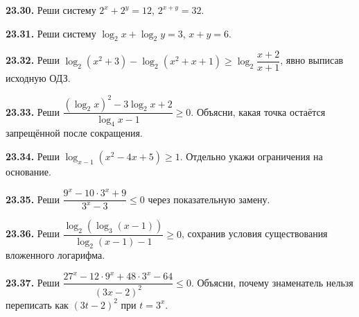 \noindent\begin{minipage}[t]{\linewidth}\textbf{23.30.}\starmark{} Реши систему \(2^x+2^y=12\), \(2^{x+y}=32\).\par\end{minipage}\par
\noindent\begin{minipage}[t]{\linewidth}\textbf{23.31.}\starmark{} Реши систему \(\log_2x+\log_2y=3\), \(x+y=6\).\par\end{minipage}\par
\noindent\begin{minipage}[t]{\linewidth}\textbf{23.32.}\starmark{} Реши \(\log_2(x^2+3)-\log_2(x^2+x+1)\ge\log_2\dfrac{x+2}{x+1}\), явно выписав исходную ОДЗ.\par\end{minipage}\par
\noindent\begin{minipage}[t]{\linewidth}\textbf{23.33.}\starmark{} Реши \(\dfrac{(\log_2x)^2-3\log_2x+2}{\log_4x-1}\ge0\). Объясни, какая точка остаётся запрещённой после сокращения.\par\end{minipage}\par
\noindent\begin{minipage}[t]{\linewidth}\textbf{23.34.}\starmark{} Реши \(\log_{x-1}(x^2-4x+5)\ge1\). Отдельно укажи ограничения на основание.\par\end{minipage}\par
\noindent\begin{minipage}[t]{\linewidth}\textbf{23.35.}\starmark{} Реши \(\dfrac{9^x-10\cdot3^x+9}{3^x-3}\le0\) через показательную замену.\par\end{minipage}\par
\noindent\begin{minipage}[t]{\linewidth}\textbf{23.36.}\starmark{} Реши \(\dfrac{\log_2(\log_3(x-1))}{\log_2(x-1)-1}\ge0\), сохранив условия существования вложенного логарифма.\par\end{minipage}\par
\noindent\begin{minipage}[t]{\linewidth}\textbf{23.37.}\starmark{} Реши \(\dfrac{27^x-12\cdot9^x+48\cdot3^x-64}{(3x-2)^2}\le0\). Объясни, почему знаменатель нельзя переписать как \((3t-2)^2\) при \(t=3^x\).\par\end{minipage}\par
\endgroup
